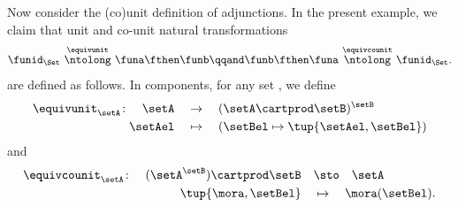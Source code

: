 Now consider the (co)unit definition of adjunctions. In the present example, we claim that unit and co-unit natural transformations 
\begin{equation}
    \funid_\Set \ \overset{\equivunit}{\ntolong}\ \funa \fthen \funb \qqand \funb \fthen \funa \ \overset{\equivcounit}{\ntolong}\ \funid_\Set.
\end{equation}
are defined as follows. In components, for any set \setA, we define
\begin{equation}\label{eq:prod-hom-adjunction-unit}
    \begin{aligned}
        \equivunit_\setA \colon \quad \setA \quad & \to  \quad (  \setA \cartprod \setB)^\setB \\
        \setAel     \quad                  & \mapsto \quad (\setBel \mapsto \tup{\setAel,\setBel})
    \end{aligned}
\end{equation}
and
\begin{equation}\label{eq:prod-hom-adjunction-co-unit}
    \begin{aligned}
        \equivcounit_\setA \colon \quad  (\setA^\setB) \cartprod \setB \quad & \sto \quad \setA \\
        \tup{\mora,\setBel} \quad                                    & \mapsto \quad \mora(\setBel).
    \end{aligned}
\end{equation}


